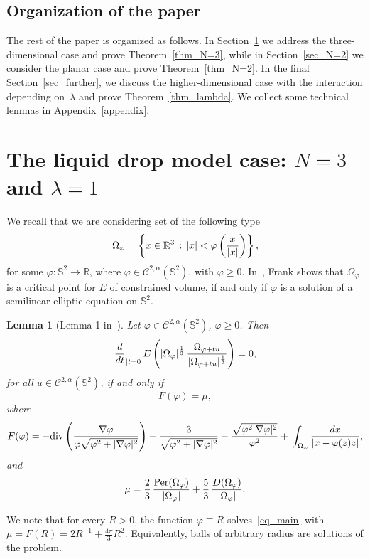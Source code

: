 \documentclass[10pt,reqno,english]{amsart}
\newcommand{\Sd}{\mathbb{S}^2}
\newcommand{\R} {\mathbb R}
\newcommand{\be}{\begin{equation}}
\newcommand{\ee}{\end{equation}}
\newtheorem{lemma}{Lemma}[section]
\theoremstyle{definition}
\numberwithin{equation}{section}
\begin{document}
\medskip


\subsection*{Organization of the paper}
The rest of the paper is organized as follows. In Section~\ref{sec_N=3} we address the three-dimensional case and prove Theorem~\ref{thm_N=3}, while in Section~\ref{sec_N=2} we consider the planar case and prove Theorem~\ref{thm_N=2}. In the final Section~\ref{sec_further}, we discuss the higher-dimensional case with the  interaction depending on~$\lambda$ and prove Theorem~\ref{thm_lambda}. We collect some technical lemmas in Appendix~\ref{appendix}.





\section{The liquid drop model case: \texorpdfstring{$N=3$}{N=3} and \texorpdfstring{$\lambda =1$}{lambda=1}}
\label{sec_N=3}

We recall that we are considering set of the following type
\[
\Omega_\varphi = \left\{ x \in \R^3 \, : \, |x| < \varphi \left( {x \over |x|} \right) \right\},
\]
for some $\varphi: \Sd \to \R$, where $\varphi \in \mathcal C^{2, \alpha } (\Sd)$, with $\varphi \geq 0$.
In~\cite[Lemma 1]{Fr19}, Frank shows that $\Omega_\varphi$ is a critical point for $E$ of constrained volume, if and only if $\varphi$ is a solution of a semilinear elliptic equation on $\Sd$.
\begin{lemma}[Lemma 1 in~\cite{Fr19}]
\label{lemma1_3D}
Let $\varphi\in\mathcal C^{2,\alpha}(\Sd)$, $\varphi\ge0$. Then
\[
{d \over dt}_{| t=0} \, E \left( |\Omega_\varphi |^{1\over 3} \, {\Omega_{\varphi +t u} \over |\Omega_{\varphi+tu}|^{1\over 3}} \right) =0,
\]
for all $u\in \mathcal C^{2,\alpha}(\Sd)$, if and only if
\be
\label{eq_main}
F(\varphi ) = \mu,
\ee
where
\[
F(\varphi )= -\mathrm{div}\left(\frac{\nabla\varphi}{\varphi\sqrt{ \varphi^2 + |\nabla \varphi|^2}}\right)+\frac{3}{\sqrt{ \varphi^2 + |\nabla \varphi|^2}}-\frac{\sqrt{ \varphi^2  |\nabla \varphi|^2}}{\varphi^2}+ \,  \int_{\Omega_\varphi}    {  d x\over |x - \varphi (z)   z|} ,
\]
and
\[
\mu= {2 \over 3} \, {{\mathrm{Per}} (\Omega_{\varphi }) \over  |\Omega_\varphi |} +{5 \over 3} \,\frac{D(\Omega_\varphi) }{|\Omega_\varphi |}.
\]
\end{lemma}


We note that for every $R>0$, the function $\varphi \equiv R$ solves~\eqref{eq_main} with $\mu = F(R) = 2R^{-1} + \frac{4\pi}{3}R^2$. Equivalently, balls of arbitrary radius are solutions of the problem.
\end{document}

